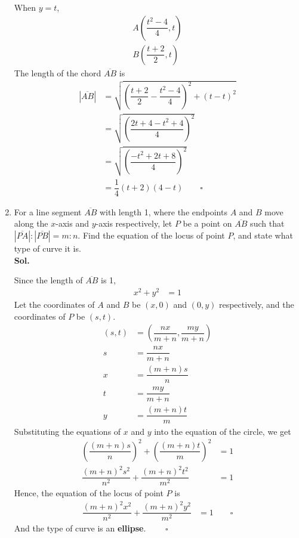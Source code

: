 \documentclass{report}
\newcommand{\sol}{\vspace{1em}\\\textbf{Sol.}}
\newcommand{\eos}{ \qquad \square}
\begin{document}
\begin{enumerate}
          When $y = t$,
          \begin{align*}
              A\left(\dfrac{t^2 - 4}{4}, t\right) \\
              B\left(\dfrac{t + 2}{2}, t\right)
          \end{align*}
          The length of the chord $\overline{AB}$ is
          \begin{align*}
              |\overline{AB}| & = \sqrt{\left(\dfrac{t + 2}{2} - \dfrac{t^2 - 4}{4}\right)^2 + (t - t)^2} \\
                              & = \sqrt{\left(\dfrac{2t + 4 - t^2 + 4}{4}\right)^2}                       \\
                              & = \sqrt{\left(\dfrac{-t^2 + 2t + 8}{4}\right)^2}                          \\
                              & = \dfrac{1}{4}(t + 2)(4 - t) \eos
          \end{align*}

          \newpage
    \item For a line segment $\overline{AB}$ with length 1, where the endpoints $A$ and
          $B$ move along the $x$-axis and $y$-axis respectively, let $P$ be a point on
          $\overline{AB}$ such that $|\overline{PA}|:|\overline{PB}|=m:n$. Find the
          equation of the locus of point $P$, and state what type of curve it is. \sol{}

          Since the length of $\overline{AB}$ is 1,
          \begin{align*}
              x^2 + y^2 & = 1
          \end{align*}
          Let the coordinates of $A$ and $B$ be $(x, 0)$ and $(0, y)$ respectively, and
          the coordinates of $P$ be $(s, t)$.
          \begin{align*}
              (s, t) & = \left(\dfrac{nx}{m+n}, \dfrac{my}{m+n}\right) \\
              s      & = \dfrac{nx}{m+n}                               \\
              x      & = \dfrac{(m+n)s}{n}                             \\
              t      & = \dfrac{my}{m+n}                               \\
              y      & = \dfrac{(m+n)t}{m}
          \end{align*}
          Substituting the equations of $x$ and $y$ into the equation of the circle, we get
          \begin{align*}
              \left(\dfrac{(m+n)s}{n}\right)^2 + \left(\dfrac{(m+n)t}{m}\right)^2 & = 1 \\
              \dfrac{(m+n)^2s^2}{n^2} + \dfrac{(m+n)^2t^2}{m^2}                   & = 1
          \end{align*}
          Hence, the equation of the locus of point $P$ is
          \begin{align*}
              \dfrac{(m+n)^2x^2}{n^2} + \dfrac{(m+n)^2y^2}{m^2} & = 1 \eos
          \end{align*}
          And the type of curve is an \textbf{ellipse}. $\eos$


\end{enumerate}
\end{document}
